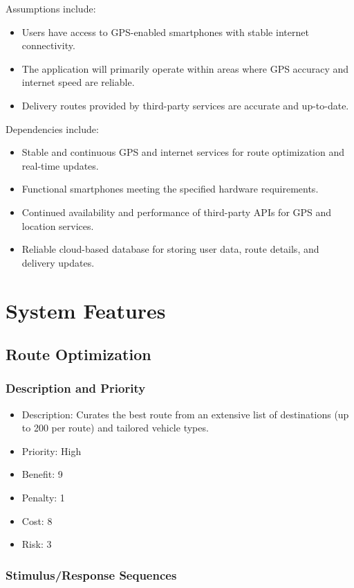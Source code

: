 Assumptions include:
\begin{itemize}
    \item Users have access to GPS-enabled smartphones with stable internet connectivity.
    \item The application will primarily operate within areas where GPS accuracy and internet speed are reliable.
    \item Delivery routes provided by third-party services are accurate and up-to-date.
\end{itemize}
Dependencies include:
\begin{itemize}
    \item Stable and continuous GPS and internet services for route optimization and real-time updates.
    \item Functional smartphones meeting the specified hardware requirements.
    \item Continued availability and performance of third-party APIs for GPS and location services.
    \item Reliable cloud-based database for storing user data, route details, and delivery updates.
\end{itemize}

\section{System Features}
\subsection{Route Optimization}
\subsubsection{Description and Priority}

\begin{itemize}
    \item Description: Curates the best route from an extensive list of destinations (up to 200 per route) and tailored vehicle types.
    \item Priority: High
    \item Benefit: 9
    \item Penalty: 1
    \item Cost: 8
    \item Risk: 3
\end{itemize}

\subsubsection{Stimulus/Response Sequences}

